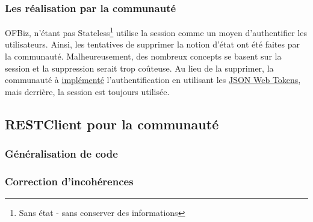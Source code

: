 \subsubsection{Les réalisation par la communauté}
OFBiz, n'étant pas Stateless\footnote{Sans état - sans conserver des informations} utilise la session comme un moyen d'authentifier les utilisateurs. Ainsi, les tentatives de supprimer la notion d'état ont été faites par la communauté. Malheureusement, des nombreux concepts se basent sur la  session et la suppression serait trop coûteuse. Au lieu de la supprimer, la communauté à \href{https://issues.apache.org/jira/browse/OFBIZ-9833}{implémenté} l'authentification en utilisant les \href{https://jwt.io/introduction/}{JSON Web Tokens}, mais derrière, la session est toujours utilisée.
\subsection{RESTClient pour la communauté}
\subsubsection{Généralisation de code}
\subsubsection{Correction d'incohérences}

